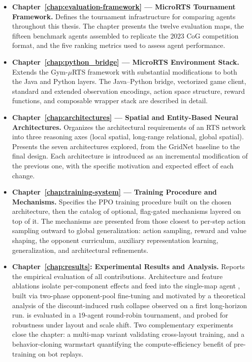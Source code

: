 \begin{itemize}

    \item \textbf{Chapter~\ref{chap:evaluation-framework} --- MicroRTS Tournament Framework.} Defines the tournament infrastructure for comparing agents throughout this thesis. The chapter presents the twelve evaluation maps, the fifteen benchmark agents assembled to replicate the $2023$ CoG competition format, and the five ranking metrics used to assess agent performance.

    \item \textbf{Chapter~\ref{chap:python_bridge} --- MicroRTS Environment Stack.} Extends the Gym-$\mu$RTS framework with substantial modifications to both the Java and Python layers. The Java--Python bridge, vectorized game client, standard and extended observation encodings, action space structure, reward functions, and composable wrapper stack are described in detail.

    \item \textbf{Chapter~\ref{chap:architectures} --- Spatial and Entity-Based Neural Architectures.} Organizes the architectural requirements of an RTS network into three reasoning axes (local spatial, long-range relational, global spatial). Presents the seven architectures explored, from the GridNet baseline to the final  design. Each architecture is introduced as an incremental modification of the previous one, with the specific motivation and expected effect of each change.

    \item \textbf{Chapter~\ref{chap:training-system} --- Training Procedure and Mechanisms.} Specifies the PPO training procedure built on the chosen architecture, then the catalog of optional, flag-gated mechanisms layered on top of it. The mechanisms are presented from those closest to per-step action sampling outward to global generalization: action sampling, reward and value shaping, the opponent curriculum, auxiliary representation learning, generalization, and architectural refinements.

    \item \textbf{Chapter~\ref{chap:results}: Experimental Results and Analysis.} Reports the empirical evaluation of all contributions. Architecture and feature ablations isolate per-component effects and feed into the single-map agent , built via two-phase opponent-pool fine-tuning and motivated by a theoretical analysis of the discount-induced rush collapse observed on a first long-horizon run.  is evaluated in a $19$-agent round-robin tournament, and probed for robustness under layout and scale shift. Two complementary experiments close the chapter: a multi-map variant validating cross-layout training, and a behavior-cloning warmstart quantifying the compute-efficiency benefit of pre-training on bot replays.

\end{itemize}

